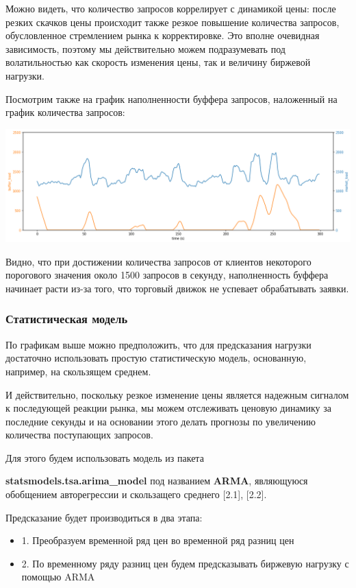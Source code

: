 Можно видеть, что количество запросов коррелирует с динамикой цены: после резких скачков цены происходит также резкое повышение количества запросов, обусловленное стремлением рынка к корректировке. Это вполне очевидная зависимость, поэтому мы действительно можем подразумевать под волатильностью как скорость изменения цены, так и величину биржевой нагрузки.

\newpage

Посмотрим также на график наполненности буффера запросов, наложенный на график количества запросов:
\begin{center}
    \includegraphics[width=450pt]{images/graph_buffer_load.png}
\end{center}

Видно, что при достижении количества запросов от клиентов некоторого порогового значения около 1500 запросов в секунду, наполненность буффера начинает расти из-за того, что торговый движок не успевает обрабатывать заявки.

\subsubsection{Статистическая модель}

По графикам выше можно предположить, что для предсказания нагрузки достаточно использовать простую статистическую модель, основанную, например, на скользящем среднем.

И действительно, поскольку резкое изменение цены является надежным сигналом к последующей реакции рынка, мы можем отслеживать ценовую динамику за последние секунды
и на основании этого делать прогнозы по увеличению количества поступающих запросов.

Для этого будем использовать модель из пакета

\textbf{statsmodels.tsa.arima\_model} под названием \textbf{ARMA}, являющуюся обобщением авторегрессии и скользащего среднего [2.1], [2.2].

Предсказание будет производиться в два этапа:
\begin{itemize}
    \item 1. Преобразуем временной ряд цен во временной ряд разниц цен
    \item 2. По временному ряду разниц цен будем предсказывать биржевую нагрузку с помощью ARMA
\end{itemize}

